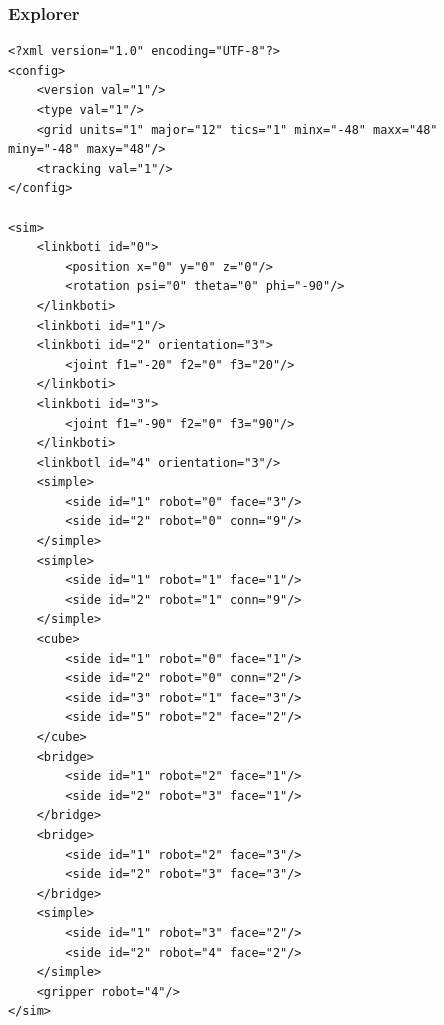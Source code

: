 \documentclass{article}
\begin{document}
\subsubsection{Explorer}
\begin{verbatim}
<?xml version="1.0" encoding="UTF-8"?>
<config>
    <version val="1"/>
    <type val="1"/>
	<grid units="1" major="12" tics="1" minx="-48" maxx="48" miny="-48" maxy="48"/>
    <tracking val="1"/>
</config>

<sim>
    <linkboti id="0">
        <position x="0" y="0" z="0"/>
        <rotation psi="0" theta="0" phi="-90"/>
    </linkboti>
    <linkboti id="1"/>
    <linkboti id="2" orientation="3">
        <joint f1="-20" f2="0" f3="20"/>
    </linkboti>
    <linkboti id="3">
        <joint f1="-90" f2="0" f3="90"/>
    </linkboti>
    <linkbotl id="4" orientation="3"/>
    <simple>
        <side id="1" robot="0" face="3"/>
        <side id="2" robot="0" conn="9"/>
    </simple>
    <simple>
        <side id="1" robot="1" face="1"/>
        <side id="2" robot="1" conn="9"/>
    </simple>
    <cube>
        <side id="1" robot="0" face="1"/>
        <side id="2" robot="0" conn="2"/>
        <side id="3" robot="1" face="3"/>
        <side id="5" robot="2" face="2"/>
    </cube>
    <bridge>
        <side id="1" robot="2" face="1"/>
        <side id="2" robot="3" face="1"/>
    </bridge>
    <bridge>
        <side id="1" robot="2" face="3"/>
        <side id="2" robot="3" face="3"/>
    </bridge>
    <simple>
        <side id="1" robot="3" face="2"/>
        <side id="2" robot="4" face="2"/>
    </simple>
    <gripper robot="4"/>
</sim>
\end{verbatim}
\end{document}
